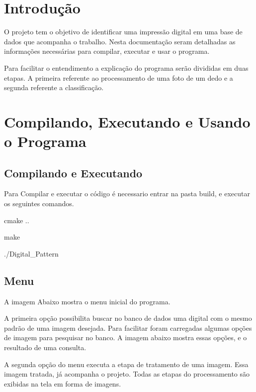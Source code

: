 \hypertarget{index_sec_intro}{}\section{Introdução}\label{index_sec_intro}
O projeto tem o objetivo de identificar uma impressão digital em uma base de dados que acompanha o trabalho. Nesta documentação seram detalhadas as informações necessárias para compilar, executar e usar o programa.

Para facilitar o entendimento a explicação do programa serão divididas em duas etapas. A primeira referente ao processamento de uma foto de um dedo e a segunda referente a classificação. ~\newline
 \hypertarget{index_sec_install}{}\section{Compilando, Executando e Usando o Programa}\label{index_sec_install}
\hypertarget{index_ssec1}{}\subsection{Compilando e Executando}\label{index_ssec1}
Para Compilar e executar o código é necessario entrar na pasta build, e executar os seguintes comandos.


\begin{DoxyItemize}
\item cmake ..
\item make
\item ./\+Digital\+\_\+\+Pattern
\end{DoxyItemize}\hypertarget{index_ssec2}{}\subsection{Menu}\label{index_ssec2}
A imagem Abaixo mostra o menu inicial do programa.



A primeira opção possibilita buscar no banco de dados uma digital com o mesmo padrão de uma imagem desejada. Para facilitar foram carregadas algumas opções de imagem para pesquisar no banco. A imagem abaixo mostra essas opções, e o resultado de uma consulta.



A segunda opção do menu executa a etapa de tratamento de uma imagem. Essa imagem tratada, já acompanha o projeto. Todas as etapas do processamento são exibidas na tela em forma de imagens.

